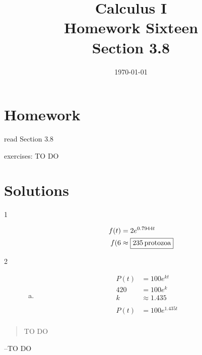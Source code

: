 \documentclass[letterpaper, landscape]{exam}
\title{Calculus I \\ Homework Sixteen \\ Section 3.8}
\author{}
\date{\today}
\begin{document}
  \maketitle

  \section{Homework}
    \begin{itemize*}
      \item read Section 3.8
      \item exercises: TO DO
    \end{itemize*}

  \ifprintanswers

  \section{Solutions}

  \begin{description}

    \item[1] 
      \begin{align*}
        f(t) & = 2 e^{0.7944t} \\
        f(6  & \approx \boxed{ \unit[235]{protozoa} } \\
      \end{align*}

    \item[2]
      \begin{enumerate}[(a)]
        \item 
          \begin{align*}
            P(t) & = 100 e^{kt} \\
            420  & = 100 e^k \\
            k    & \approx 1.435 \\
            \\
            P(t) & = 100 e^{1.435 t} \\
          \end{align*}

      \end{enumerate}
  \end{description}

  \else
    \vspace{10 cm}
    \begin{quote}
      \begin{em}
        TO DO
      \end{em}
    \end{quote}
    \hspace{2 cm} --TO DO
  \fi
\end{document}
